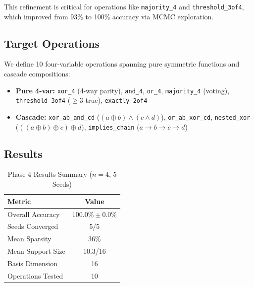 \documentclass[Royal,times,sageh]{sagej}
\begin{document}
This refinement is critical for operations like \texttt{majority\_4} and \texttt{threshold\_3of4}, which improved from 93\% to 100\% accuracy via MCMC exploration.

\subsection{Target Operations}

We define 10 four-variable operations spanning pure symmetric functions and cascade compositions:
\begin{itemize}
    \item \textbf{Pure 4-var:} \texttt{xor\_4} (4-way parity), \texttt{and\_4}, \texttt{or\_4}, \texttt{majority\_4} (voting), \texttt{threshold\_3of4} ($\geq$3 true), \texttt{exactly\_2of4}
    \item \textbf{Cascade:} \texttt{xor\_ab\_and\_cd} ($(a \oplus b) \land (c \land d)$), \texttt{or\_ab\_xor\_cd}, \texttt{nested\_xor} ($((a \oplus b) \oplus c) \oplus d$), \texttt{implies\_chain} ($a \to b \to c \to d$)
\end{itemize}

\subsection{Results}

\begin{table}[t]
\centering
\caption{Phase 4 Results Summary ($n=4$, 5 Seeds)}
\label{tab:phase4_summary}
\begin{tabular}{lc}
\toprule
\textbf{Metric} & \textbf{Value} \\
\midrule
Overall Accuracy & $100.0\% \pm 0.0\%$ \\
Seeds Converged & 5/5 \\
Mean Sparsity & 36\% \\
Mean Support Size & 10.3/16 \\
Basis Dimension & 16 \\
Operations Tested & 10 \\
\bottomrule
\end{tabular}
\end{table}
\end{document}
